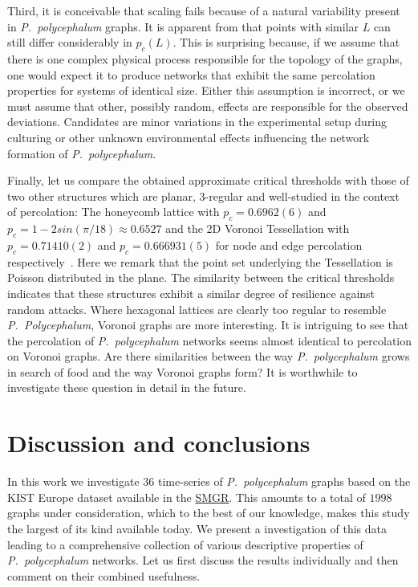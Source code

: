 		Third, it is conceivable that scaling fails because of a natural variability present in \emph{P.~polycephalum} graphs. It is apparent from  that points with similar $L$ can still differ considerably in $p_c(L)$. This is surprising because, if we assume that there is one complex physical process responsible for the topology of the graphs, one would expect it to produce networks that exhibit the same percolation properties for systems of identical size. Either this assumption is incorrect, or we must assume that other, possibly random, effects are responsible for the observed deviations. Candidates are minor variations in the experimental setup during culturing or other unknown environmental effects influencing the network formation of \emph{P.~polycephalum}.

		Finally, let us compare the obtained approximate critical thresholds with those of two other structures which are planar, $3$-regular and well-studied in the context of percolation: The honeycomb lattice with $p_c = 0.6962(6)$ and $p_c = 1-2 sin (\pi/18) \approx 0.6527$ and the 2D Voronoi Tessellation with $p_c = 0.71410(2)$ and $p_c = 0.666931(5)$ for node and edge percolation respectively~\cite{djordjevic1982site,becker2009percolation}. Here we remark that the point set underlying the Tessellation is Poisson distributed in the plane. The similarity between the critical thresholds indicates that these structures exhibit a similar degree of resilience against random attacks. Where hexagonal lattices are clearly too regular to resemble \emph{P.~Polycephalum}, Voronoi graphs are more interesting. It is intriguing to see that the percolation of \emph{P.~polycephalum} networks seems almost identical to percolation on Voronoi graphs. Are there similarities between the way \emph{P.~polycephalum} grows in search of food and the way Voronoi graphs form? It is worthwhile to investigate these question in detail in the future.	


	\section{Discussion and conclusions}

			In this work we investigate $36$ time-series of \emph{P.~polycephalum} graphs based on the KIST Europe dataset available in the \href{http://smgr.mpi-inf.mpg.de}{SMGR}. This amounts to a total of $1998$ graphs under consideration, which to the best of our knowledge, makes this study the largest of its kind available today. We present a investigation of this data leading to a comprehensive collection of various descriptive properties of \emph{P.~polycephalum} networks. Let us first discuss the results individually and then comment on their combined usefulness.


